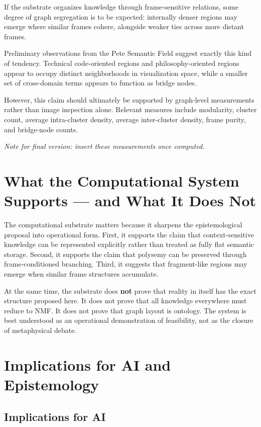 \documentclass[11pt,a4paper]{article}
\begin{document}
If the substrate organizes knowledge through frame-sensitive relations, some degree of graph segregation is to be expected: internally denser regions may emerge where similar frames cohere, alongside weaker ties across more distant frames.

Preliminary observations from the Pete Semantic Field suggest exactly this kind of tendency. Technical code-oriented regions and philosophy-oriented regions appear to occupy distinct neighborhoods in visualization space, while a smaller set of cross-domain terms appears to function as bridge nodes.

However, this claim should ultimately be supported by graph-level measurements rather than image inspection alone. Relevant measures include modularity, cluster count, average intra-cluster density, average inter-cluster density, frame purity, and bridge-node counts.

\textit{Note for final version: insert these measurements once computed.}

\section{What the Computational System Supports --- and What It Does Not}

The computational substrate matters because it sharpens the epistemological proposal into operational form. First, it supports the claim that context-sensitive knowledge can be represented explicitly rather than treated as fully flat semantic storage. Second, it supports the claim that polysemy can be preserved through frame-conditioned branching. Third, it suggests that fragment-like regions may emerge when similar frame structures accumulate.

At the same time, the substrate does \textbf{not} prove that reality in itself has the exact structure proposed here. It does not prove that all knowledge everywhere must reduce to NMF. It does not prove that graph layout is ontology. The system is best understood as an operational demonstration of feasibility, not as the closure of metaphysical debate.

\section{Implications for AI and Epistemology}

\subsection{Implications for AI}
\end{document}
